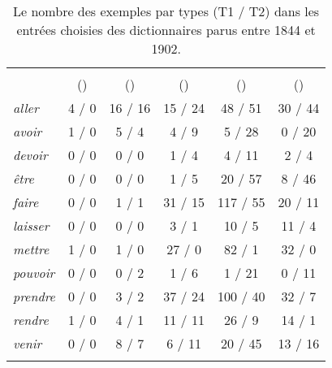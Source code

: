 \documentclass[output=paper,colorlinks,citecolor=brown,arabicfont,chinesefont,booklanguage=french]{langscibook}
\begin{document}
\begin{otherlanguage}{french}
\begin{table}[p]
\caption{Le nombre des exemples par types (T1 / T2) dans les entrées choisies des dictionnaires parus entre 1844 et 1902.}
\label{til:tab3}
\begin{tabular}{>{\itshape}l *5{c}}
\lsptoprule
& \citeauthor{Kiss1844} & \citeauthor{Babos1865} & \citeauthor{Martonffy1879} & \citeauthor{Pokorny1880} & \citeauthor{Theisz1902}\\
& (\citeyear{Kiss1844}) & (\citeyear{Babos1865}) & (\citeyear{Martonffy1879}) & (\citeyear{Pokorny1880}) & (\citeyear{Theisz1902})\\
\midrule
aller & \cellcolor{lightgray}4 / 0 & 16 / 16 & \cellcolor{gray}15 / 24 & \cellcolor{gray}48 / 51 & \cellcolor{gray}30 / 44 \\
avoir & \cellcolor{lightgray}1 / 0 & \cellcolor{lightgray}5 / 4 & \cellcolor{gray}4 / 9 & \cellcolor{gray}5 / 28 & \cellcolor{gray}0 / 20 \\
devoir & 0 / 0 & 0 / 0 & \cellcolor{gray}1 / 4 & \cellcolor{gray}4 / 11 & \cellcolor{gray}2 / 4 \\
être & 0 / 0 & 0 / 0 & \cellcolor{gray}1 / 5 & \cellcolor{gray}20 / 57 & \cellcolor{gray}8 / 46 \\
faire & 0 / 0 & 1 / 1 & \cellcolor{lightgray}31 / 15 & \cellcolor{lightgray}117 / 55 & \cellcolor{lightgray}20 / 11 \\
laisser & 0 / 0 & 0 / 0 & \cellcolor{lightgray}3 / 1 & \cellcolor{lightgray}10 / 5 & \cellcolor{lightgray}11 / 4 \\
mettre & \cellcolor{lightgray}1 / 0 & \cellcolor{lightgray}1 / 0 & \cellcolor{lightgray}27 / 0 & \cellcolor{lightgray}82 / 1 & \cellcolor{lightgray}32 / 0 \\
pouvoir & 0 / 0 & \cellcolor{gray}0 / 2 & \cellcolor{gray}1 / 6 & \cellcolor{gray}1 / 21 & \cellcolor{gray}0 / 11 \\
prendre & 0 / 0 & \cellcolor{lightgray}3 / 2 & \cellcolor{lightgray}37 / 24 & \cellcolor{lightgray}100 / 40 & \cellcolor{lightgray}32 / 7 \\
rendre & \cellcolor{lightgray}1 / 0 & \cellcolor{lightgray}4 / 1 & 11 / 11 & \cellcolor{lightgray}26 / 9 & \cellcolor{lightgray}14 / 1 \\
venir & 0 / 0 & \cellcolor{lightgray}8 / 7 & \cellcolor{gray}6 / 11 & \cellcolor{gray}20 / 45 & \cellcolor{gray}13 / 16 \\
\lspbottomrule
\end{tabular}
\end{table}


\end{otherlanguage}
\end{document}

